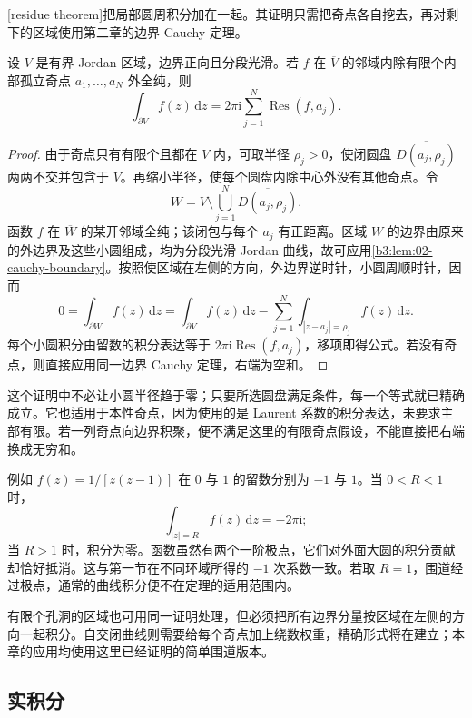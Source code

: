 [residue theorem]把局部圆周积分加在一起。其证明只需把奇点各自挖去，再对剩下的区域使用第二章的边界 Cauchy 定理。
\begin{theorem}[留数]\label{b3:thm:03-residue}
设 \(V\) 是有界 Jordan 区域，边界正向且分段光滑。若 \(f\) 在 \(\overline V\) 的邻域内除有限个内部孤立奇点 \(a_1,\ldots,a_N\) 外全纯，则
\[
 \int_{\partial V}f(z)\,\mathrm{d}z=2\pi\mathrm{i}\sum_{j=1}^N\operatorname{Res}(f,a_j).
\]
\end{theorem}
\begin{proof}
由于奇点只有有限个且都在 \(V\) 内，可取半径 \(\rho_j>0\)，使闭圆盘 \(\overline{D(a_j,\rho_j)}\) 两两不交并包含于 \(V\)。再缩小半径，使每个圆盘内除中心外没有其他奇点。令
\[
 W=V\setminus\bigcup_{j=1}^N\overline{D(a_j,\rho_j)}.
\]
函数 \(f\) 在 \(\overline W\) 的某开邻域全纯；该闭包与每个 \(a_j\) 有正距离。区域 \(W\) 的边界由原来的外边界及这些小圆组成，均为分段光滑 Jordan 曲线，故可应用\cref{b3:lem:02-cauchy-boundary}。按照使区域在左侧的方向，外边界逆时针，小圆周顺时针，因而
\[
 0=\int_{\partial W}f(z)\,\mathrm{d}z
 =\int_{\partial V}f(z)\,\mathrm{d}z
  -\sum_{j=1}^N\int_{|z-a_j|=\rho_j}f(z)\,\mathrm{d}z.
\]
每个小圆积分由留数的积分表达等于 \(2\pi\mathrm{i}\operatorname{Res}(f,a_j)\)，移项即得公式。若没有奇点，则直接应用同一边界 Cauchy 定理，右端为空和。
\end{proof}
这个证明中不必让小圆半径趋于零；只要所选圆盘满足条件，每一个等式就已精确成立。它也适用于本性奇点，因为使用的是 Laurent 系数的积分表达，未要求主部有限。若一列奇点向边界积聚，便不满足这里的有限奇点假设，不能直接把右端换成无穷和。

\ProseParagraphBreak

例如 \(f(z)=1/[z(z-1)]\) 在 \(0\) 与 \(1\) 的留数分别为 \(-1\) 与 \(1\)。当 \(0<R<1\) 时，
\[
 \int_{|z|=R}f(z)\,\mathrm{d}z=-2\pi\mathrm{i};
\]
当 \(R>1\) 时，积分为零。函数虽然有两个一阶极点，它们对外面大圆的积分贡献却恰好抵消。这与第一节在不同环域所得的 \(-1\) 次系数一致。若取 \(R=1\)，围道经过极点，通常的曲线积分便不在定理的适用范围内。

\ProseParagraphBreak

有限个孔洞的区域也可用同一证明处理，但必须把所有边界分量按区域在左侧的方向一起积分。自交闭曲线则需要给每个奇点加上绕数权重，精确形式将在建立；本章的应用均使用这里已经证明的简单围道版本。

\subsection{实积分}
\label{b3:subsec:030303}

